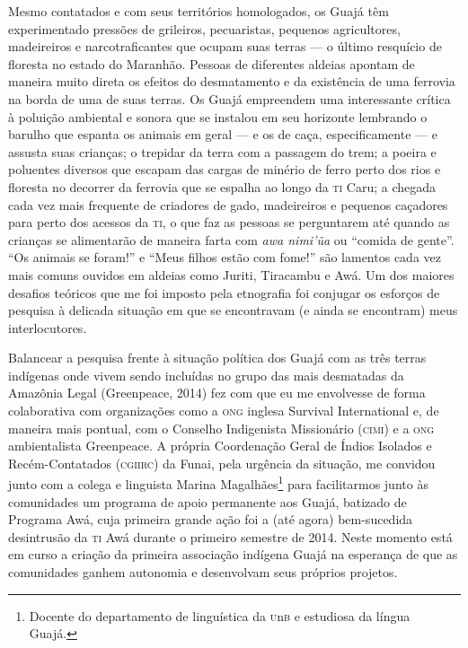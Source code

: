 Mesmo contatados e com seus territórios homologados, os Guajá têm
experimentado pressões de grileiros, pecuaristas, pequenos agricultores,
madeireiros e narcotraficantes que ocupam suas terras --- o último
resquício de floresta no estado do Maranhão. Pessoas de diferentes
aldeias apontam de maneira muito direta os efeitos do desmatamento e da
existência de uma ferrovia na borda de uma de suas terras. Os Guajá
empreendem uma interessante crítica à poluição ambiental e sonora que se
instalou em seu horizonte lembrando o barulho que espanta os animais em
geral --- e os de caça, especificamente --- e assusta suas crianças; o
trepidar da terra com a passagem do trem; a poeira e poluentes diversos
que escapam das cargas de minério de ferro perto dos rios e floresta no
decorrer da ferrovia que se espalha ao longo da \textsc{ti} Caru; a chegada cada
vez mais frequente de criadores de gado, madeireiros e pequenos
caçadores para perto dos acessos da \textsc{ti}, o que faz as pessoas se
perguntarem até quando as crianças se alimentarão de maneira farta com
\textit{awa nimi'ũa} ou ``comida de gente''. ``Os animais se foram!'' e
``Meus filhos estão com fome!'' são lamentos cada vez mais comuns
ouvidos em aldeias como Juriti, Tiracambu e Awá. Um dos maiores desafios
teóricos que me foi imposto pela etnografia foi conjugar os esforços de
pesquisa à delicada situação em que se encontravam (e ainda se
encontram) meus interlocutores.

Balancear a pesquisa frente à situação política dos Guajá com as três
terras indígenas onde vivem sendo incluídas no grupo das mais desmatadas
da Amazônia Legal (Greenpeace, 2014) fez com que eu me envolvesse de
forma colaborativa com organizações como a \textsc{ong} inglesa Survival
International e, de maneira mais pontual, com o Conselho Indigenista
Missionário (\textsc{cimi}) e a \textsc{ong} ambientalista Greenpeace. A própria
Coordenação Geral de Índios Isolados e Recém-Contatados (\textsc{cgiirc}) da
Funai, pela urgência da situação, me convidou junto com a colega e
linguista Marina Magalhães\footnote{Docente do departamento de linguística da
\textsc{u}n\textsc{b} e estudiosa da língua Guajá.} para facilitarmos junto às comunidades
um programa de apoio permanente aos Guajá, batizado de Programa Awá,
cuja primeira grande ação foi a (até agora) bem-sucedida desintrusão da
\textsc{ti} Awá durante o primeiro semestre de 2014. Neste momento está em curso
a criação da primeira associação indígena Guajá na esperança de que as
comunidades ganhem autonomia e desenvolvam seus próprios projetos.

